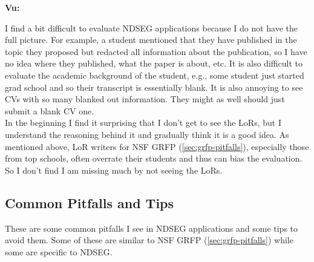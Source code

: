 \documentclass[oneside,11pt,dvipsnames]{book}
\newenvironment{commentbox}[1][]{
  \small
  \begin{mybox}
    {\small \textbf{#1}}
  }{
  \end{mybox}
}
\begin{document}
\begin{commentbox}[Vu:]
I find a bit difficult to evaluate NDSEG applications because I do not have the full picture.  For example, a student mentioned that they have published in the topic they proposed but redacted all information about the publication, so I have no idea where they published, what the paper is about, etc.  
It is also difficult to evaluate the academic background of the student, e.g., some student just started grad school and so their transcript is essentially blank. It is also annoying to see CVs with so many blanked out information. They might as well should just submit a blank CV one. 
\\

In the beginning I find it surprising that I don't get to see the LoRs, but I understand the reasoning behind it and gradually think it is a good idea. As mentioned above, LoR writers for NSF GRFP (\autoref{sec:grfp-pitfalls}), especially those from top schools, often overrate their students and thus can bias the evaluation. So I don't find I am missing much by not seeing the LoRs.
\end{commentbox}

\subsection{Common Pitfalls and Tips}\label{sec:ndseg-pitfalls}

These are some common pitfalls I see in NDSEG applications and some tips to avoid them.  Some of these are similar to NSF GRFP (\autoref{sec:grfp-pitfalls}) while some are specific to NDSEG.
\end{document}
